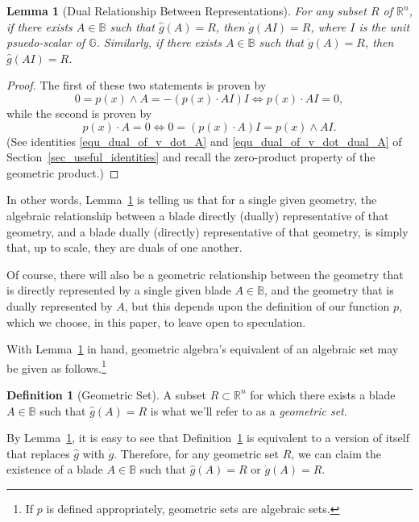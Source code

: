 \documentclass{birkjour}
\newtheorem{lem}[thm]{Lemma}
\theoremstyle{definition}
\newtheorem{defn}[thm]{Definition}
\theoremstyle{remark}
\numberwithin{equation}{section}
\newcommand{\R}{\mathbb{R}}
\newcommand{\B}{\mathbb{B}}
\newcommand{\G}{\mathbb{G}}
\newcommand{\gd}{\dot{g}}
\newcommand{\gh}{\hat{g}}
\begin{document}
\begin{lem}[Dual Relationship Between Representations]\label{lem_dual_rep}
For any subset $R$ of $\R^n$, if there exists $A\in\B$ such that $\gh(A)=R$, then $\gd(AI)=R$, where
$I$ is the unit psuedo-scalar of $\G$.  Similarly, if there exists $A\in\B$ such that $\gd(A)=R$, then $\gh(AI)=R$.
\end{lem}
\begin{proof}
The first of these two statements is proven by
\begin{equation*}
0=p(x)\wedge A=-(p(x)\cdot AI)I\iff p(x)\cdot AI=0,
\end{equation*}
while the second is proven by
\begin{equation*}
p(x)\cdot A=0\iff 0=(p(x)\cdot A)I=p(x)\wedge AI.
\end{equation*}
(See identities \eqref{equ_dual_of_v_dot_A} and \eqref{equ_dual_of_v_dot_dual_A} of Section~\ref{sec_useful_identities} and
recall the zero-product property of the geometric product.)
\end{proof}

In other words, Lemma~\ref{lem_dual_rep} is telling us that for a single given geometry, the algebraic relationship between a
blade directly (dually) representative of that geometry, and a blade dually (directly) representative of that geometry, is simply
that, up to scale, they are duals of one another.

Of course, there will also be a geometric relationship between the geometry that is directly represented by a single given
blade $A\in\B$, and the geometry that is dually represented by $A$, but this depends upon the definition of our function
$p$, which we choose, in this paper, to leave open to speculation.

With Lemma~\ref{lem_dual_rep} in hand, geometric algebra's equivalent of an algebraic set may be given as follows.\footnote{If $p$ is
defined appropriately, geometric sets are algebraic sets.}

\begin{defn}[Geometric Set]\label{def_geo_set}
A subset $R\subset\R^n$ for which there exists a blade $A\in\B$ such that $\gh(A)=R$ is what we'll refer to as a {\it geometric set}.
\end{defn}

By Lemma~\ref{lem_dual_rep}, it is easy to see that Definition~\ref{def_geo_set} is equivalent to a version of itself that replaces $\gh$ with $\gd$.
Therefore, for any geometric set $R$, we can claim the existence of a blade $A\in\B$ such that $\gh(A)=R$ or $\gd(A)=R$.
\end{document}
